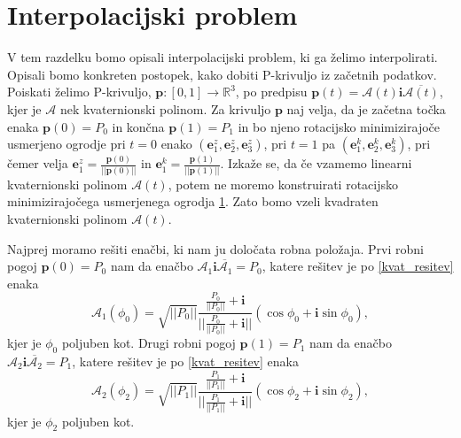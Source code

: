 \documentclass[mat1]{fmfdelo}
\newcommand{\R}{\mathbb R}
\newcommand{\ii}{\boldsymbol i}
\newcommand{\pp}{\boldsymbol p}
\newcommand{\e}{\boldsymbol e}
\newcommand{\oo}{\boldsymbol o}
\newcommand{\uu}{\boldsymbol u}
\newcommand{\vv}{\boldsymbol v}
\newcommand{\A}{\mathcal A}
\begin{document}
\fi





\iffalse 

Ko sestavimo vse stvari skupaj, opišemo naš postopek z naslednjim algoritmom.\\
\textbf{Vhodni podatki:} začetna točka $\pp_z = d_z \oo_z$, končna točka $\pp_k = d_k \oo_k$, usmerjenost končnih točk $\left( \oo_z, \uu_z, \vv_z\right)$,  $\left( \oo_k, \uu_k, \vv_k\right)$, $\oo_z != \oo_k$.
\begin{enumerate}
	\item a
	\item b
\end{enumerate}
\fi

\section{Interpolacijski problem}{\label{int_problem}}
V tem razdelku bomo opisali interpolacijski problem, ki ga želimo interpolirati.
Opisali bomo konkreten postopek, kako dobiti P-krivuljo iz začetnih podatkov. 
 Poiskati želimo P-krivuljo, $\pp:\left[0,1\right] \rightarrow \R^3$, po predpisu $\pp(t) = \A(t)\ii\overline{\A(t)}$, kjer je $\A$ nek kvaternionski polinom. Za krivuljo $\pp$ naj velja, da je začetna točka enaka $\pp(0) = P_0$ in končna $\pp(1)=P_1$ in bo njeno rotacijsko minimizirajoče usmerjeno ogrodje pri $t=0$ enako $\left( \e_1^{z},\e_2^{z},\e_3^{z} \right)$, pri $t=1$ pa $\left( \e_1^{k},\e_2^{k},\e_3^{k} \right)$, pri čemer velja $\e_1^{z}= \frac{\pp(0)}{||\pp(0)||}$ in $\e_1^{k}= \frac{\pp(1)}{||\pp(1)||}$. Izkaže se, da če vzamemo linearni kvaternionski polinom $\A(t)$, potem ne moremo konstruirati rotacijsko minimizirajočega usmerjenega ogrodja \ref{}. Zato bomo vzeli kvadraten kvaternionski polinom $\A(t)$.

	Najprej moramo rešiti enačbi, ki nam ju določata robna položaja.
	Prvi robni pogoj $\pp(0) = P_0$ nam da enačbo $\A_1 \ii \overline{\A_1} = P_0$, katere rešitev je po \ref{kvat_resitev} enaka 
	\begin{equation}
		\A_1(\phi_0) = \sqrt{||P_0||} \frac{\frac{P_0}{||P_0||}+\ii}{||\frac{P_0}{||P_0||}+\ii||} \left( \cos \phi_0 + \ii \sin \phi_0 \right),
	\end{equation}
	kjer je $\phi_0$ poljuben kot.
	Drugi robni pogoj $\pp(1) = P_1$ nam da enačbo $\A_2 \ii \overline{\A_2} = P_1$, katere rešitev je po \ref{kvat_resitev} enaka 
	\begin{equation}
	\A_2(\phi_2) = \sqrt{||P_1||} \frac{\frac{P_1}{||P_1||}+\ii}{||\frac{P_1}{||P_1||}+\ii||} \left( \cos \phi_2 + \ii \sin \phi_2 \right),
	\end{equation}
	kjer je $\phi_2$ poljuben kot.
	
\end{document}
